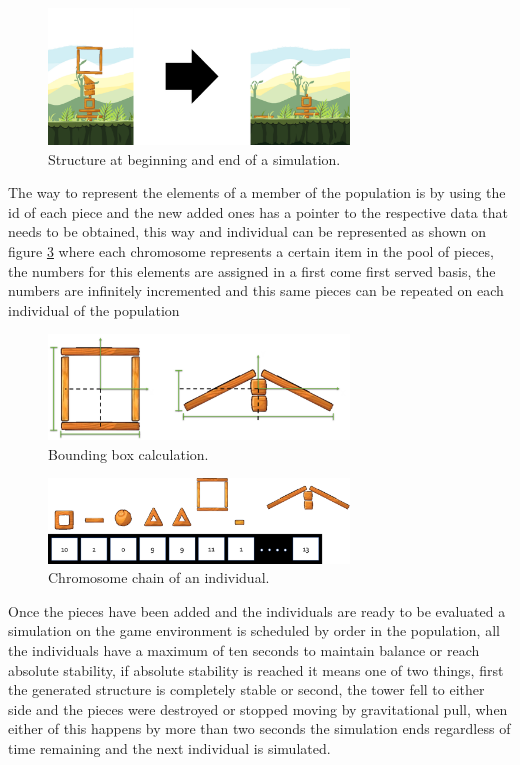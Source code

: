 \documentclass[conference]{IEEEtran}
\begin{document}


\begin{figure}[htbp]
\centerline{\includegraphics[width=80mm]{Images/simulation_bef_aft_example.png}}
\caption{Structure at beginning and end of a simulation.}
\label{test_old}
\end{figure}

The way to represent the elements of a member of the population is by using the
id of each piece and the new added ones has a pointer to the respective data
that needs to be obtained, this way and individual can be represented as shown
on figure \ref{old_chrom} where each chromosome represents a certain item in the
pool of pieces, the numbers for this elements are assigned in a first come first
served basis, the numbers are infinitely incremented and this same pieces can be
repeated on each individual of the population

\begin{figure}[htbp]
\centerline{\includegraphics[width=80mm]{Images/bounding_box_calculation.png}}
\caption{Bounding box calculation.}
\label{bounding_boc_calc}
\end{figure}

\begin{figure}[htbp]
\centerline{\includegraphics[width=80mm]{Images/chromosome_chain_example.png}}
\caption{Chromosome chain of an individual.}
\label{old_chrom}
\end{figure}

Once the pieces have been added and the individuals are ready to be evaluated a
simulation on the game environment is scheduled by order in the population, all
the individuals have a maximum of ten seconds to maintain balance or reach
absolute stability, if absolute stability is reached it means one of two things,
first the generated structure is completely stable or second, the tower fell to
either side and the pieces were destroyed or stopped moving by gravitational
pull, when either of this happens by more than two seconds the simulation ends
regardless of time remaining and the next individual is simulated.
\end{document}
